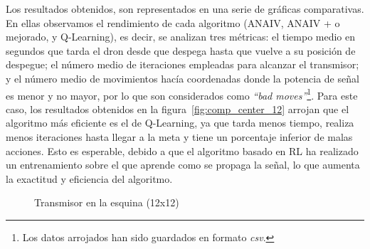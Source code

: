 Los resultados obtenidos, son representados en una serie de gráficas comparativas. En ellas observamos el rendimiento de cada algoritmo (\ac{ANAIV}, \ac{ANAIV} + o mejorado, y Q-Learning), es decir, se analizan tres métricas: el tiempo medio en segundos que tarda el dron desde que despega hasta que vuelve a su posición de despegue; el número medio de iteraciones empleadas para alcanzar el transmisor; y el número medio de movimientos hacía coordenadas donde la potencia de señal es menor y no mayor, por lo que son considerados como \emph{``bad moves''}\footnote[5]{Los datos arrojados han sido guardados en formato \emph{csv}.}. Para este caso, los resultados obtenidos en la figura~\ref{fig:comp_center_12} arrojan que el algoritmo más eficiente es el de Q-Learning, ya que tarda menos tiempo, realiza menos iteraciones hasta llegar a la meta y tiene un porcentaje inferior de malas acciones. Esto es esperable, debido a que el algoritmo basado en \ac{RL} ha realizado un entrenamiento sobre el que aprende como se propaga la señal, lo que aumenta la exactitud y eficiencia del algoritmo.\\

\begin{figure} [tp]
	\centering
	\quad
	\caption{Transmisor en la esquina (12x12)}
	\label{fig:map_p_esq_12}
\end{figure}


